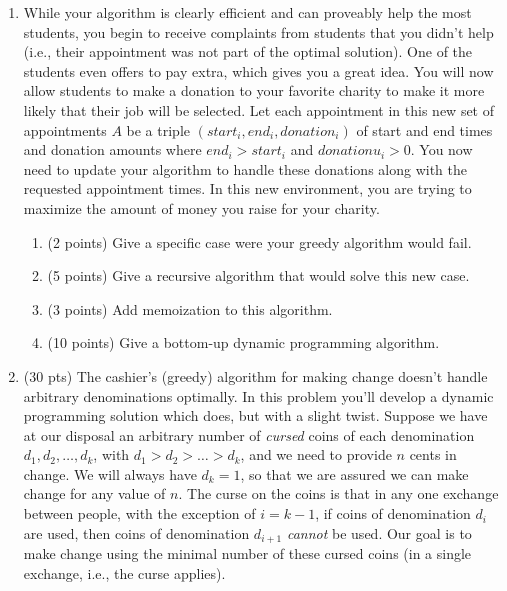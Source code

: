 \documentclass[12pt]{article}
\begin{document}
\begin{enumerate}
\item %
While your algorithm is clearly efficient and can proveably help the most
students, you begin to receive complaints from students that you didn’t
help (i.e., their appointment was not part of the optimal solution).
One of the students even offers to pay extra, which gives you a great
idea. You will now allow students to make a donation to your favorite
charity to make it more likely that their job will be selected. Let
each appointment in this new set of appointments $A$ be a triple 
 $(start_i, end_i, donation_i)$ of start and end times and donation amounts
where $end_i>start_i$ and $donationu_i>0$. You now need to update your
algorithm to handle these donations along with the requested appointment times.
In this new environment, you are trying to maximize the amount of money
you raise for your charity.
\pagebreak

\begin{enumerate}
    \item \label{2a} (2 points) Give a specific case were your greedy algorithm would fail.
\pagebreak
    \item \label{2b} (5 points) Give a recursive algorithm that would solve this new case.
\pagebreak
    \item \label{2c} (3 points) Add memoization to this algorithm.
\pagebreak
    \item \label{2d} (10 points) Give a bottom-up dynamic programming algorithm.
\pagebreak
\end{enumerate}

\item (30 pts) 
The cashier's (greedy) algorithm for making change doesn't handle arbitrary
denominations optimally. In this problem you'll develop a dynamic
programming solution which does, but with a slight twist. Suppose we
have at our disposal an arbitrary number of \emph{cursed} coins of each
denomination $d_1, d_2, \dotsc, d_k$, with $d_1 > d_2 > \dotsc > d_k$,
and we need to provide $n$ cents in change. We will always have
$d_k=1$, so that we are assured we can make change for any value of
$n$. The curse on the coins is that in any one exchange between people,
with the exception of $i=k-1$, if coins of denomination $d_i$ are used,
then coins of denomination $d_{i+1}$ \emph{cannot} be used. Our goal is
to make change using the minimal number of these cursed coins (in a
single exchange, i.e., the curse applies).
\pagebreak
	

\end{enumerate}
\end{document}
